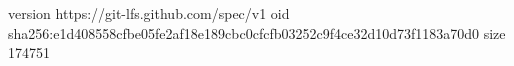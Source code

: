 version https://git-lfs.github.com/spec/v1
oid sha256:e1d408558cfbe05fe2af18e189cbc0cfcfb03252c9f4ce32d10d73f1183a70d0
size 174751
